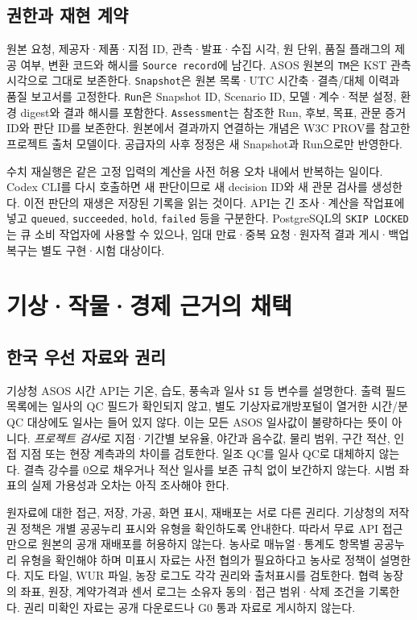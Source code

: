 \documentclass[11pt,a4paper]{article}
\begin{document}
\subsection{권한과 재현 계약}
원본 요청, 제공자·제품·지점 ID, 관측·발표·수집 시각, 원 단위, 품질 플래그의 제공 여부, 변환 코드와 해시를 \texttt{Source record}에 남긴다. ASOS 원본의 \texttt{TM}은 KST 관측시각으로 그대로 보존한다\cite{kma-api}. \texttt{Snapshot}은 원본 목록·UTC 시간축·결측/대체 이력과 품질 보고서를 고정한다. \texttt{Run}은 Snapshot ID, Scenario ID, 모델·계수·적분 설정, 환경 digest와 결과 해시를 포함한다. \texttt{Assessment}는 참조한 Run, 후보, 목표, 관문 증거 ID와 판단 ID를 보존한다. 원본에서 결과까지 연결하는 개념은 W3C PROV를 참고한 프로젝트 출처 모델이다\cite{w3c-prov}. 공급자의 사후 정정은 새 Snapshot과 Run으로만 반영한다.

수치 재실행은 같은 고정 입력의 계산을 사전 허용 오차 내에서 반복하는 일이다. Codex CLI를 다시 호출하면 새 판단이므로 새 decision ID와 새 관문 검사를 생성한다. 이전 판단의 재생은 저장된 기록을 읽는 것이다. API는 긴 조사·계산을 작업표에 넣고 \texttt{queued}, \texttt{succeeded}, \texttt{hold}, \texttt{failed} 등을 구분한다. PostgreSQL의 \texttt{SKIP LOCKED}는 큐 소비 작업자에 사용할 수 있으나, 임대 만료·중복 요청·원자적 결과 게시·백업 복구는 별도 구현·시험 대상이다\cite{postgres-select}.

\section{기상·작물·경제 근거의 채택}
\subsection{한국 우선 자료와 권리}
기상청 ASOS 시간 API는 기온, 습도, 풍속과 일사 \texttt{SI} 등 변수를 설명한다. 출력 필드 목록에는 일사의 QC 필드가 확인되지 않고, 별도 기상자료개방포털이 열거한 시간/분 QC 대상에도 일사는 들어 있지 않다\cite{kma-api,kma-qc}. 이는 모든 ASOS 일사값이 불량하다는 뜻이 아니다. \emph{프로젝트 검사}로 지점·기간별 보유율, 야간과 음수값, 물리 범위, 구간 적산, 인접 지점 또는 현장 계측과의 차이를 검토한다. 일조 QC를 일사 QC로 대체하지 않는다. 결측 강수를 0으로 채우거나 적산 일사를 보존 규칙 없이 보간하지 않는다. 시범 좌표의 실제 가용성과 오차는 아직 조사해야 한다.

원자료에 대한 접근, 저장, 가공, 화면 표시, 재배포는 서로 다른 권리다. 기상청의 저작권 정책은 개별 공공누리 표시와 유형을 확인하도록 안내한다\cite{kma-rights}. 따라서 무료 API 접근만으로 원본의 공개 재배포를 허용하지 않는다. 농사로 매뉴얼·통계도 항목별 공공누리 유형을 확인해야 하며 미표시 자료는 사전 협의가 필요하다고 농사로 정책이 설명한다\cite{nongsaro-rights}. 지도 타일, WUR 파일, 농장 로그도 각각 권리와 출처표시를 검토한다. 협력 농장의 좌표, 원장, 계약가격과 센서 로그는 소유자 동의·접근 범위·삭제 조건을 기록한다. 권리 미확인 자료는 공개 다운로드나 G0 통과 자료로 게시하지 않는다.
\end{document}
